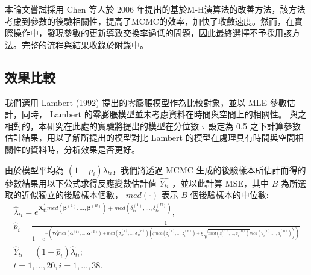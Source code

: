 \documentclass[12pt,a4paper]{article}
\begin{document}
\begin{CJK}{UTF8}{bkai}
本論文嘗試採用 Chen 等人於 2006 年提出的基於M-H演算法的改善方法，該方法考慮到參數的後驗相關性，提高了MCMC的效率，加快了收斂速度。然而，在實際操作中，發現參數的更新導致交換率過低的問題，因此最終選擇不予採用該方法。完整的流程與結果收錄於附錄中。

\subsection{效果比較}\label{sec:4.2}
我們選用 Lambert (1992) 提出的零膨脹模型作為比較對象，並以 MLE 參數估計，同時， Lambert 的零膨脹模型並未考慮資料在時間與空間上的相關性。
與之相對的，本研究在此處的實驗將提出的模型在分位數 $\tau$ 設定為 0.5 之下計算參數估計結果，用以了解所提出的模型對比 Lambert 的模型在處理具有時間與空間相關性的資料時，分析效果是否更好。

 \setlength\abovedisplayskip{25pt}
 \setlength\belowdisplayskip{25pt}
由於模型平均為 $\left(1-p_i\right) \lambda_{ti}$，我們將透過 MCMC 生成的後驗樣本所估計而得的參數結果用以下公式求得反應變數估計值 $\hat{Y_{ti}}$ ，並以此計算 MSE，其中 $B$ 為所選取的近似獨立的後驗樣本個數， $med(\cdot)$ 表示 $B$ 個後驗樣本的中位數:
\begin{gather*}
\hat{\lambda}_{ti} = e^{\bm{X_{ti}^\prime}med(\bm{\beta}^{(1)},\ldots,\bm{\beta}^{(B)})+med(\delta^{(1)}_{ti},\ldots,\delta^{(B)}_{ti})}, \\[5mm]
\hat{p}_i = \frac{1}{1+e^{-(\bm{W_i^\prime}med(\bm{\alpha}^{(1)},\ldots,\bm{\alpha}^{(B)})+med(\sigma^{(1)}_R,\ldots,\sigma^{(B)}_R)(\zeta med(z^{(1)}_i,\ldots,z^{(B)}_i)+\xi \sqrt[]{med(z^{(1)}_i,\ldots,z^{(B)}_i)} med(u^{(1)}_i,\ldots,u^{(B)}_i)))}} \\[5mm]
\hat{Y}_{ti} = \left(1-\hat{p}_i\right)\hat{\lambda}_{ti}; \\[5mm]
t = 1,\dots,20, i = 1,\dots,38.
\end{gather*}


\end{CJK}
\end{document}
